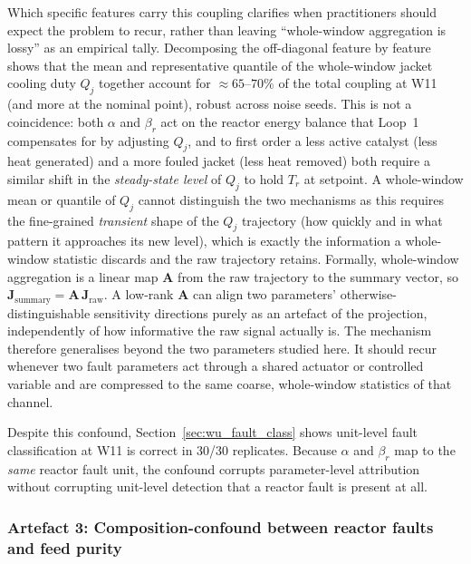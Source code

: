 \documentclass[aps,pre,twocolumn,superscriptaddress]{revtex4-2}
\begin{document}
Which specific features carry this coupling clarifies when practitioners
should expect the problem to recur, rather than leaving ``whole-window
aggregation is lossy'' as an empirical tally. Decomposing the off-diagonal
feature by feature shows that the mean and representative quantile
of the whole-window jacket cooling duty $Q_j$ together account for $\approx65$--$70\%$ of the
total coupling at W11 (and more at the nominal point), robust across noise
seeds. This is not a coincidence: both $\alpha$ and $\beta_r$ act on the
reactor energy balance that Loop~1 compensates for by adjusting $Q_j$, and to
first order a less active catalyst (less heat generated) and a more fouled
jacket (less heat removed) both require a similar shift in the
\emph{steady-state level} of $Q_j$ to hold $T_r$ at setpoint. A whole-window
mean or quantile of $Q_j$ cannot distinguish the two mechanisms as this requires the
fine-grained \emph{transient} shape of the $Q_j$ trajectory (how quickly
and in what pattern it approaches its new level),
which is exactly the information a whole-window statistic discards and the
raw trajectory retains. Formally, whole-window aggregation is a linear map
$\mathbf{A}$ from the raw trajectory to the summary vector, so
$\mathbf{J}_\mathrm{summary} = \mathbf{A}\,\mathbf{J}_\mathrm{raw}$. A
low-rank $\mathbf{A}$ can align two parameters' otherwise-distinguishable
sensitivity directions purely as an artefact of the projection, independently
of how informative the raw signal actually is.  The mechanism therefore
generalises beyond the two parameters studied here. It should recur whenever
two fault parameters act through a shared actuator or controlled variable and
are compressed to the same coarse, whole-window statistics of that channel.

Despite this confound, Section~\ref{sec:wu_fault_class} shows unit-level fault
classification at W11 is correct in 30/30 replicates. Because $\alpha$ and
$\beta_r$ map to the \emph{same} reactor fault unit, the confound corrupts
parameter-level attribution without
corrupting unit-level detection that a reactor fault is present at all.

\subsubsection{Artefact 3: Composition-confound between reactor faults and feed
  purity}
\label{sec:wu_artifact3}
\end{document}
